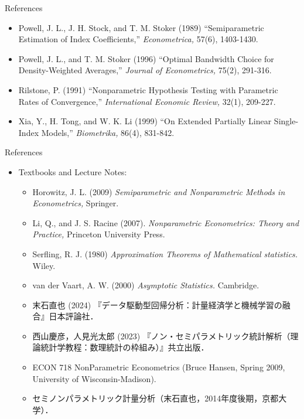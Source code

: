\documentclass[xcolor=svgnames,dvipdfmx,cjk]{beamer}
\theoremstyle{example}
\begin{document}
\begin{frame}{References}
  \begin{itemize}
  \item Powell, J. L., J. H. Stock, and T. M. Stoker (1989)
        ``Semiparametric Estimation of Index Coefficients,''
        \textit{Econometrica,} 57(6), 1403-1430. 
  \item Powell, J. L., and T. M. Stoker (1996)
        ``Optimal Bandwidth Choice for Density-Weighted Averages,''
        \textit{Journal of Econometrics,} 75(2), 291-316.
  \item Rilstone, P. (1991)
        ``Nonparametric Hypothesis Testing with Parametric Rates of Convergence,''
        \textit{International Economic Review,} 32(1), 209-227.
  \item Xia, Y., H. Tong, and W. K. Li (1999)
        ``On Extended Partially Linear Single-Index Models,''
        \textit{Biometrika,} 86(4), 831-842.
  \end{itemize}
\end{frame}

\begin{frame}{References}
  \begin{itemize}
    \item Textbooks and Lecture Notes:
    \begin{itemize}
      \item Horowitz, J. L. (2009)
            \textit{Semiparametric and Nonparametric Methods in Econometrics,}
            Springer.
      \item Li, Q., and J. S. Racine (2007). 
            \textit{Nonparametric Econometrics: Theory and Practice,} 
            Princeton University Press.
      \item Serfling, R. J. (1980)
            \textit{Approximation Theorems of Mathematical statistics.} Wiley.
      \item van der Vaart, A. W. (2000)
            \textit{Asymptotic Statistics.} Cambridge.
      \item 末石直也 (2024) 『データ駆動型回帰分析：計量経済学と機械学習の融合』日本評論社．
      \item 西山慶彦，人見光太郎 (2023) 『ノン・セミパラメトリック統計解析（理論統計学教程：数理統計の枠組み）』共立出版．
      \item ECON 718 NonParametric Econometrics (Bruce Hansen, Spring 2009, University of Wisconsin-Madison).
      \item セミノンパラメトリック計量分析（末石直也，2014年度後期，京都大学）．
    \end{itemize}
  \end{itemize}
\end{frame}
\end{document}
